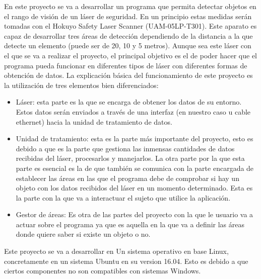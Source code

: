
En este proyecto se va a desarrollar un programa que permita detectar objetos en el rango de visión de un láser de seguridad. En un principio estas medidas serán tomadas con el Hokuyo Safety Laser Scanner (UAM-05LP-T301). Este aparato es capaz de desarrollar tres áreas de detección dependiendo de la distancia a la que detecte un elemento (puede ser de 20, 10 y 5 metros). Aunque sea este láser con el que se va a realizar el proyecto, el principal objetivo es el de poder hacer que el programa pueda funcionar en diferentes tipos de láser con diferentes formas de obtención de datos.
La explicación básica del funcionamiento de este proyecto es la utilización de tres elementos bien diferenciados:
\begin{itemize}
    \item Láser: esta parte es la que se encarga de obtener los datos de su entorno. Estos datos serán enviados a través de una interfaz (en nuestro caso u cable ethernet) hacia la unidad de tratamiento de datos.
    \item Unidad de tratamiento: esta es la parte más importante del proyecto, esto es debido a que es la parte que gestiona las inmensas cantidades de datos recibidas del láser, procesarlos y manejarlos. La otra parte por la que esta parte es esencial es la de que también se comunica con la parte encargada de establecer las áreas en las que el programa debe de comprobar si hay un objeto con los datos recibidos del láser en un momento determinado. Esta es la parte con la que va a interactuar el sujeto que utilice la aplicación.
    \item Gestor de áreas: Es otra de las partes del proyecto con la que le usuario va a actuar sobre el programa ya que es aquella en la que va a definir las áreas donde quiere saber si existe un objeto o no.
\end{itemize}

Este proyecto se va a desarrollar en Un sistema operativo en base Linux, concretamente en un sistema Ubuntu en su version 16.04. Esto es debido a que ciertos componentes no son compatibles con sistemas  Windows.
